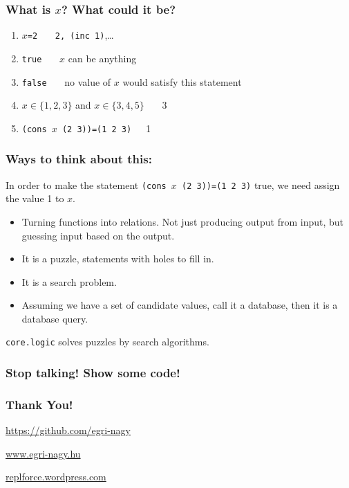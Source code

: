 \documentclass{beamer}
\begin{document}
\begin{frame}\frametitle{What is $x$? What could it be?}
\begin{enumerate}
\item $x$\texttt{=2} \pause\ \ \ \texttt{2, (inc 1)},\ldots\pause
\item \texttt{true} \pause\ \ \ $x$ can be anything\pause
\item \texttt{false} \pause\ \ \ no value of $x$ would satisfy this
  statement\pause
\item $x\in\{1,2,3\}$ and $x\in\{3,4,5\}$ \pause\ \ \ 3\pause
\item \texttt{(cons $x$ (2 3))=(1 2 3)}\pause\ \ \ 1\pause
\end{enumerate}
\end{frame}


\begin{frame}\frametitle{Ways to think about this:}
In order to make the statement \texttt{(cons $x$ (2 3))=(1 2 3)} true,
we need assign the value 1 to $x$.

\begin{itemize}
\item Turning functions into relations. Not just producing output from
  input, but guessing input based on the output.
\item It is a puzzle, statements with holes to fill in.
\item It is a search problem.
\item Assuming we have a set of candidate values, call it a database,
  then it is a database query.
\end{itemize}

\pause
\texttt{core.logic} solves puzzles by search algorithms.
\end{frame}

\begin{frame}\frametitle{Stop talking! Show some code!}
\end{frame}

\begin{frame}\frametitle{Thank You!}
\begin{center}
\huge
\url{https://github.com/egri-nagy}

\url{www.egri-nagy.hu}

\url{replforce.wordpress.com}

\end{center}
\end{frame}
\end{document}
